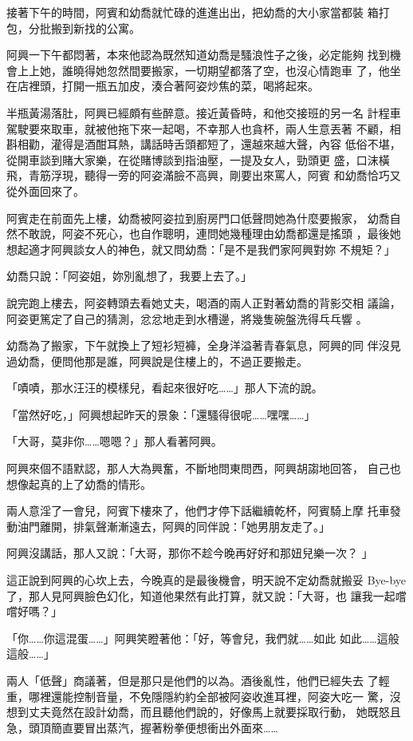 接著下午的時間，阿賓和幼喬就忙碌的進進出出，把幼喬的大小家當都裝
箱打包，分批搬到新找的公寓。

阿興一下午都悶著，本來他認為既然知道幼喬是騷浪性子之後，必定能夠
找到機會上上她，誰曉得她忽然間要搬家，一切期望都落了空，也沒心情跑車
了，他坐在店裡頭，打開一瓶五加皮，湊合著阿姿炒焦的菜，喝將起來。

半瓶黃湯落肚，阿興已經頗有些醉意。接近黃昏時，和他交接班的另一名
計程車駕駛要來取車，就被他拖下來一起喝，不幸那人也貪杯，兩人生意丟著
不顧，相斟相勸，灌得是酒酣耳熱，講話時舌頭都短了，還越來越大聲，內容
低俗不堪，從開車談到賭大家樂，在從賭博談到指油壓，一提及女人，勁頭更
盛，口沫橫飛，青筋浮現，聽得一旁的阿姿滿臉不高興，剛要出來罵人，阿賓
和幼喬恰巧又從外面回來了。

阿賓走在前面先上樓，幼喬被阿姿拉到廚房門口低聲問她為什麼要搬家，
幼喬自然不敢說，阿姿不死心，也自作聰明，連問她幾種理由幼喬都還是搖頭
，最後她想起適才阿興談女人的神色，就又問幼喬：「是不是我們家阿興對妳
不規矩？」

幼喬只說：「阿姿姐，妳別亂想了，我要上去了。」

說完跑上樓去，阿姿轉頭去看她丈夫，喝酒的兩人正對著幼喬的背影交相
議論，阿姿更篤定了自己的猜測，忿忿地走到水槽邊，將幾隻碗盤洗得乓乓響
。

幼喬為了搬家，下午就換上了短衫短褲，全身洋溢著青春氣息，阿興的同
伴沒見過幼喬，便問他那是誰，阿興說是住樓上的，不過正要搬走。

「嘖嘖，那水汪汪的模樣兒，看起來很好吃……」那人下流的說。

「當然好吃，」阿興想起昨天的景象：「還騷得很呢……嘿嘿……」

「大哥，莫非你……嗯嗯？」那人看著阿興。

阿興來個不語默認，那人大為興奮，不斷地問東問西，阿興胡謅地回答，
自己也想像起真的上了幼喬的情形。

兩人意淫了一會兒，阿賓下樓來了，他們才停下話繼續乾杯，阿賓騎上摩
托車發動油門離開，排氣聲漸漸遠去，阿興的同伴說：「她男朋友走了。」

阿興沒講話，那人又說：「大哥，那你不趁今晚再好好和那妞兒樂一次？
」

這正說到阿興的心坎上去，今晚真的是最後機會，明天說不定幼喬就搬妥
Bye-bye了，那人見阿興臉色幻化，知道他果然有此打算，就又說：「大哥，也
讓我一起嚐嚐好嗎？」

「你……你這混蛋……」阿興笑瞪著他：「好，等會兒，我們就……如此
如此……這般這般……」

兩人「低聲」商議著，但是那只是他們的以為。酒後亂性，他們已經失去
了輕重，哪裡還能控制音量，不免隱隱約約全部被阿姿收進耳裡，阿姿大吃一
驚，沒想到丈夫竟然在設計幼喬，而且聽他們說的，好像馬上就要採取行動，
她既怒且急，頭頂簡直要冒出蒸汽，握著粉拳便想衝出外面來……

